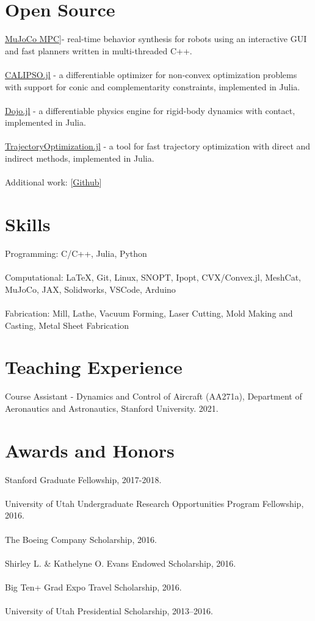 \documentclass[10pt]{article}
\begin{document}
\section*{Open Source}
\href{https://github.com/deepmind/mujoco_mpc}{MuJoCo MPC}]- real-time behavior synthesis for robots using an interactive GUI and fast planners written in multi-threaded C++.
\\
\\
\href{https://github.com/thowell/CALIPSO.jl}{CALIPSO.jl} - a differentiable optimizer for non-convex optimization problems with support for conic and complementarity constraints, implemented in Julia.
\\
\\
\href{https://github.com/dojo-sim/Dojo.jl}{Dojo.jl} - a differentiable physics engine for rigid-body dynamics with contact, implemented in Julia.
\\
\\
\href{https://github.com/RoboticExplorationLab/TrajectoryOptimization.jl}{TrajectoryOptimization.jl} - a tool for fast trajectory optimization with direct and indirect methods, implemented in Julia.
\\
\\
Additional work: [\href{https://github.com/thowell}{Github}]

\section*{Skills}
Programming: C/C++, Julia, Python
\\
\\
Computational: \LaTeX, Git, Linux, SNOPT, Ipopt, CVX/Convex.jl, MeshCat, MuJoCo, JAX, Solidworks, VSCode, Arduino
\\
\\
Fabrication: Mill, Lathe, Vacuum Forming, Laser Cutting, Mold Making and Casting, Metal Sheet Fabrication

\section*{Teaching Experience}
Course Assistant - Dynamics and Control of Aircraft (AA271a), Department of Aeronautics and Astronautics, Stanford University. 2021.

\section*{Awards and Honors}
Stanford Graduate Fellowship,  2017-2018.
\\
\\
University of Utah Undergraduate Research Opportunities Program Fellowship, 2016.
\\
\\
The Boeing Company Scholarship, 2016.
\\
\\
Shirley L. \& Kathelyne O. Evans Endowed Scholarship, 2016.
\\
\\
Big Ten+ Grad Expo Travel Scholarship, 2016.
\\
\\
University of Utah Presidential Scholarship, 2013–2016.
\end{document}
